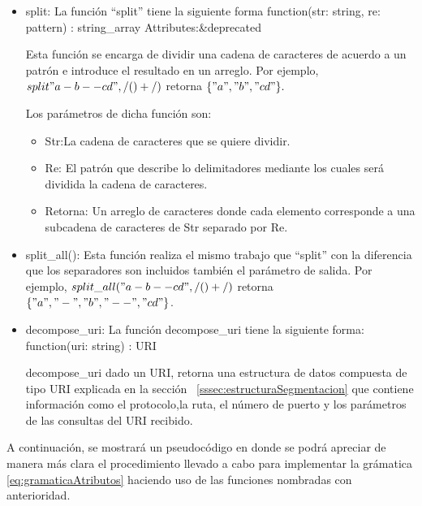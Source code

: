 \begin{itemize}
\item split:
La función “split” tiene la siguiente forma
function(str: string, re: pattern) : string\_array Attributes:\&deprecated

Esta función se encarga de dividir una cadena de caracteres de acuerdo a un patrón e introduce el resultado en un arreglo. Por ejemplo, $split"a-b--cd", /(\-)+/)$ retorna $\{"a", "b", "cd"\}.$

Los parámetros de dicha función son:

\begin{itemize}
\item Str:La cadena de caracteres que se quiere dividir. 
\item Re: El patrón que describe lo delimitadores mediante los cuales será dividida la cadena de caracteres. 
\item Retorna: Un arreglo de caracteres donde cada elemento corresponde a una subcadena de caracteres de Str separado por Re.
\end{itemize}

\item split\_all():
Esta función realiza el mismo trabajo que “split” con la diferencia que los separadores son incluidos también el parámetro de salida.  Por ejemplo, $split\_all("a-b--cd", /(\-)+/)$ retorna $\{"a", "-", "b", "--", "cd"\}$.

\item decompose\_uri:
La función decompose\_uri tiene la siguiente forma: function(uri: string) : URI

decompose\_uri dado un URI, retorna una estructura de datos compuesta de tipo URI explicada en la sección ~\ref{sssec:estructuraSegmentacion} que contiene información como el protocolo,la ruta, el número de puerto y los parámetros de las consultas del URI recibido.
\end{itemize}

A continuación, se mostrará un pseudocódigo en donde se podrá apreciar de manera más clara el procedimiento llevado a cabo para implementar la grámatica \ref{eq:gramaticaAtributos} haciendo uso de las funciones nombradas con anterioridad.

